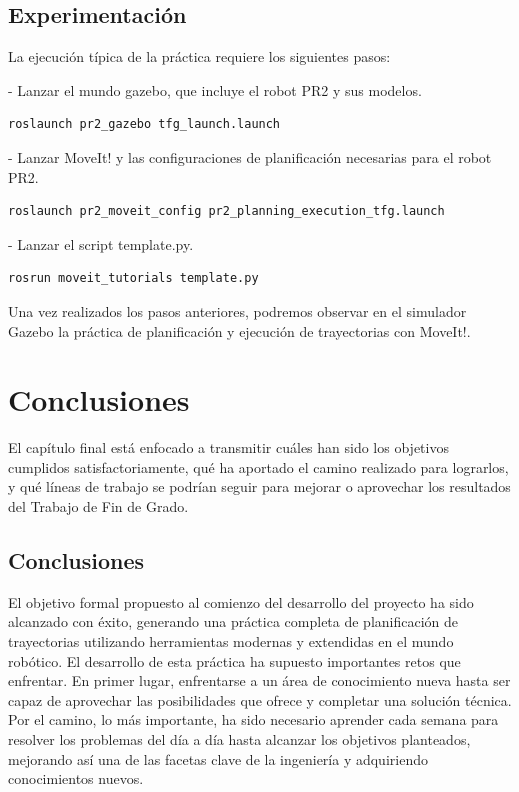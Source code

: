 \documentclass[12pt,spanish,chapterprefix, numbers=noenddot]{book}
\numberwithin{equation}{section}
\numberwithin{figure}{section}
\begin{document}
\section{Experimentación}
La ejecución típica \cite{tfg_video_1} \cite{tfg_video_2} de la práctica requiere los siguientes pasos: 

- Lanzar el mundo gazebo, que incluye el robot PR2 y sus modelos.
\vspace{20pt}
	\begin{lstlisting}[frame=single]
roslaunch pr2_gazebo tfg_launch.launch
    \end{lstlisting}
- Lanzar MoveIt! y las configuraciones de planificación necesarias para el robot PR2.
\vspace{20pt}
	\begin{lstlisting}[frame=single]
roslaunch pr2_moveit_config pr2_planning_execution_tfg.launch
    \end{lstlisting}
- Lanzar el script template.py.
	\begin{lstlisting}[frame=single]
rosrun moveit_tutorials template.py
    \end{lstlisting}

Una vez realizados los pasos anteriores, podremos observar en el simulador Gazebo la práctica de planificación y ejecución de trayectorias con MoveIt!. 

\chapter{Conclusiones}
El capítulo final está enfocado a transmitir cuáles han sido los objetivos cumplidos satisfactoriamente, qué ha aportado el camino realizado para lograrlos, y qué líneas de trabajo se podrían seguir para mejorar o aprovechar los resultados del Trabajo de Fin de Grado.  
\section{Conclusiones}
El objetivo formal propuesto al comienzo del desarrollo del proyecto ha sido alcanzado con éxito, generando una práctica completa de planificación de trayectorias utilizando herramientas modernas y extendidas en el mundo robótico. El desarrollo de esta práctica ha supuesto importantes retos que enfrentar. En primer lugar, enfrentarse a un área de conocimiento nueva hasta ser capaz de aprovechar las posibilidades que ofrece y completar una solución técnica. Por el camino, lo más importante, ha sido necesario aprender cada semana para resolver los problemas del día a día hasta alcanzar los objetivos planteados, mejorando así una de las facetas clave de la ingeniería y adquiriendo conocimientos nuevos. 
\end{document}

